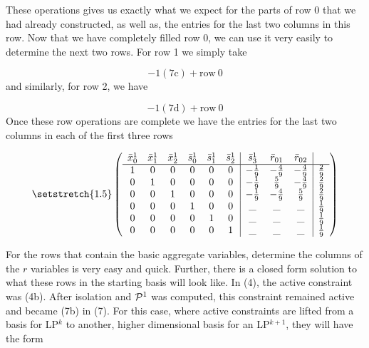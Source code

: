 \documentclass[11pt]{article} %
\newcommand{\cP}{{\cal P}}
\begin{document}
	These operations gives us exactly what we expect for the parts of row 0 that we had already constructed, as well as, the entries for the last two columns in this row.  Now that we have completely filled row 0, we can use it very easily to determine the next two rows.  For row 1 we simply take
	
	\begin{equation}
	-1(7\text{c}) + \text{row} \ 0
	\end{equation}
	and similarly, for row 2, we have
	
	\begin{equation}
	-1(7\text{d}) + \text{row} \ 0
	\end{equation}
	Once these row operations are complete we have the entries for the last two columns in each of the first three rows 
	
	\begin{equation}\setstretch{1.5}
	\begin{pmatrix}
	\begin{array}{cccccc|ccc|c}
	\bar{x}^1_0 & \bar{x}^1_1 & \bar{x}^1_2 & \bar{s}^1_0 & \bar{s}^1_1 & \bar{s}^1_2 & \bar{s}^1_3 & \bar{r}_{01} & \bar{r}_{02} \\
	\hline
	1 & 0 & 0 & 0 & 0 & 0 & -\frac{1}{9} & -\frac{4}{9} & -\frac{4}{9} & \frac{2}{9} \\ 
	0 & 1 & 0 & 0 & 0 & 0 & -\frac{1}{9} &  \frac{5}{9} & -\frac{4}{9} & \frac{2}{9} \\ 
	0 & 0 & 1 & 0 & 0 & 0 & -\frac{1}{9} & -\frac{4}{9} & \frac{5}{9} & \frac{2}{9} \\ 
	0 & 0 & 0 & 1 & 0 & 0 & \_ & \_ & \_ & \frac{1}{9} \\ 
	0 & 0 & 0 & 0 & 1 & 0 & \_ & \_ & \_ & \frac{1}{9} \\
	0 & 0 & 0 & 0 & 0 & 1 & \_ & \_ & \_ & \frac{1}{9} \\
	\end{array}
	\end{pmatrix}
	\end{equation}
	
	For the rows that contain the basic aggregate variables, determine the columns of the $r$ variables is very easy and quick.  Further, there is a closed form solution to what these rows in the starting basis will look like.  In (4), the active constraint was (4b).  After isolation and $\cP^1$ was computed, this constraint remained active and became (7b) in (7).  For this case, where active constraints are lifted from a basis for LP$^k$ to another, higher dimensional basis for an LP$^{k + 1}$, they will have the form 
	
\end{document}
